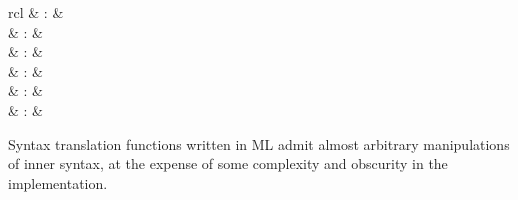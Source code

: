 \begin{isabellebody}
\begin{isamarkuptext}
\begin{matharray}{rcl}
    \hypertarget{command.typed-print-translation}{\hyperlink{command.typed-print-translation}{\mbox{}}} & : &  \\
    \hypertarget{command.print-ast-translation}{\hyperlink{command.print-ast-translation}{\mbox{}}} & : &  \\
    \hypertarget{ML antiquotation.class-syntax}{\hyperlink{ML antiquotation.class-syntax}{\mbox{}}} & : &  \\
    \hypertarget{ML antiquotation.type-syntax}{\hyperlink{ML antiquotation.type-syntax}{\mbox{}}} & : &  \\
    \hypertarget{ML antiquotation.const-syntax}{\hyperlink{ML antiquotation.const-syntax}{\mbox{}}} & : &  \\
    \hypertarget{ML antiquotation.syntax-const}{\hyperlink{ML antiquotation.syntax-const}{\mbox{}}} & : &  \\
  \end{matharray}

  Syntax translation functions written in ML admit almost arbitrary
  manipulations of inner syntax, at the expense of some complexity and
  obscurity in the implementation.


\end{isamarkuptext}
\end{isabellebody}
